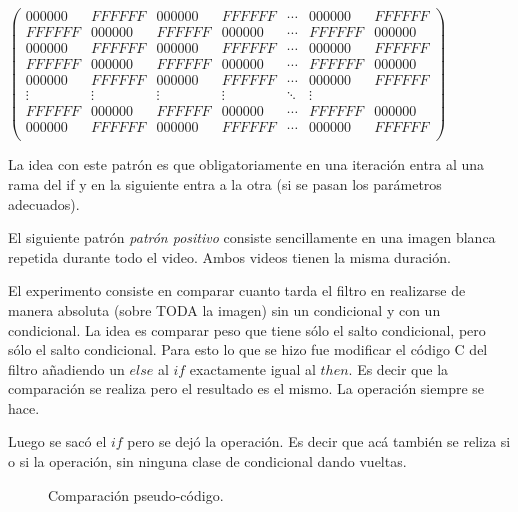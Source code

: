 \begin{center}
$
 \begin{pmatrix}
   000000 & FFFFFF & 000000 & FFFFFF & \cdots & 000000 & FFFFFF \\
   FFFFFF & 000000 & FFFFFF & 000000 & \cdots & FFFFFF & 000000 \\
   000000 & FFFFFF & 000000 & FFFFFF & \cdots & 000000 & FFFFFF \\
   FFFFFF & 000000 & FFFFFF & 000000 & \cdots & FFFFFF & 000000 \\
   000000 & FFFFFF & 000000 & FFFFFF & \cdots & 000000 & FFFFFF \\
   \vdots & \vdots & \vdots  & \vdots  & \ddots & \vdots  \\
   FFFFFF & 000000 & FFFFFF & 000000 & \cdots & FFFFFF & 000000 \\
   000000 & FFFFFF & 000000 & FFFFFF & \cdots & 000000 & FFFFFF \\
\end{pmatrix}
$
\end{center}

	La idea con este patrón es que obligatoriamente en una iteración
entra al una rama del if y en la siguiente entra a la otra (si se pasan
los parámetros adecuados).

	El siguiente patrón \textit{patrón positivo} consiste sencillamente en una
imagen blanca repetida durante todo el video. Ambos videos tienen
la misma duración.

	El experimento consiste en comparar cuanto tarda el filtro
en realizarse de manera absoluta (sobre TODA la imagen) sin un
condicional y con un condicional. La idea es comparar peso que 
tiene sólo el salto condicional, pero sólo el salto condicional. Para esto
lo que se hizo fue modificar el código C del filtro añadiendo un 
$else$ al $if$ exactamente igual al $then$. Es decir que la comparación
se realiza pero el resultado es el mismo. La operación siempre se hace.

	Luego se sacó el $if$ pero se dejó la operación. Es decir que acá
también se reliza si o si la operación, sin ninguna clase de condicional
dando vueltas.




\begin{figure}[h]
	\begin{mdframed}
			\colplacechunks
	\end{mdframed}
	\caption{Comparación pseudo-código.}
	\label{fig:pseudo-codigo}
\end{figure}






